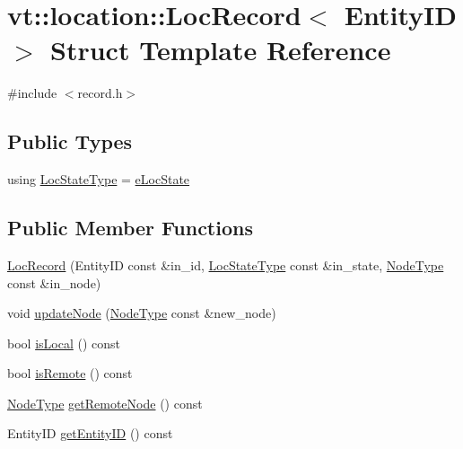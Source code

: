 \hypertarget{structvt_1_1location_1_1_loc_record}{}\section{vt\+:\+:location\+:\+:Loc\+Record$<$ Entity\+ID $>$ Struct Template Reference}
\label{structvt_1_1location_1_1_loc_record}


{\ttfamily \#include $<$record.\+h$>$}

\subsection*{Public Types}
\begin{DoxyCompactItemize}
\item 
using \hyperlink{structvt_1_1location_1_1_loc_record_a292a4bfaf13edb8d1c2e7a4fdd5421fb}{Loc\+State\+Type} = \hyperlink{namespacevt_1_1location_a7a5c74aad68cf57281515029d8521547}{e\+Loc\+State}
\end{DoxyCompactItemize}
\subsection*{Public Member Functions}
\begin{DoxyCompactItemize}
\item 
\hyperlink{structvt_1_1location_1_1_loc_record_ade33ca9b748edfc1cacdf1738700ef5b}{Loc\+Record} (Entity\+ID const \&in\+\_\+id, \hyperlink{namespacevt_1_1location_a7a5c74aad68cf57281515029d8521547}{Loc\+State\+Type} const \&in\+\_\+state, \hyperlink{namespacevt_a866da9d0efc19c0a1ce79e9e492f47e2}{Node\+Type} const \&in\+\_\+node)
\item 
void \hyperlink{structvt_1_1location_1_1_loc_record_aa66e4f13e89526636b87b3c950bdd91c}{update\+Node} (\hyperlink{namespacevt_a866da9d0efc19c0a1ce79e9e492f47e2}{Node\+Type} const \&new\+\_\+node)
\item 
bool \hyperlink{structvt_1_1location_1_1_loc_record_af3bb2160b4ad36664ef47171cf6d58a4}{is\+Local} () const
\item 
bool \hyperlink{structvt_1_1location_1_1_loc_record_a891b73a9c0092f6b022514309190cc8e}{is\+Remote} () const
\item 
\hyperlink{namespacevt_a866da9d0efc19c0a1ce79e9e492f47e2}{Node\+Type} \hyperlink{structvt_1_1location_1_1_loc_record_ada9c469d3fd01a0eaed1af3a99fc9b2c}{get\+Remote\+Node} () const
\item 
Entity\+ID \hyperlink{structvt_1_1location_1_1_loc_record_a710d9bbd99da0c19d1270a06eff6dd6a}{get\+Entity\+ID} () const
\end{DoxyCompactItemize}
